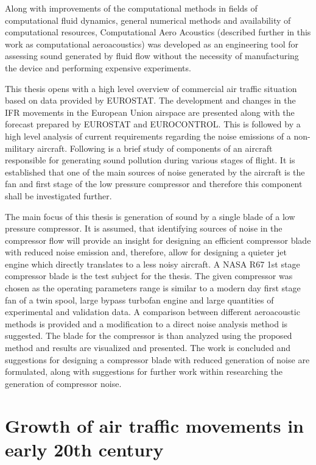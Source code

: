 Along with improvements of the computational methods in fields of computational fluid dynamics, general numerical methods and availability of computational resources, Computational Aero Acoustics (described further in this work as computational aeroacoustics) was developed as an engineering tool for assessing sound generated by fluid flow without the necessity of manufacturing the device and performing expensive experiments.

This thesis opens with a high level overview of commercial air traffic situation based on data provided by EUROSTAT. The development and changes in the IFR movements in the European Union airspace are presented along with the forecast prepared by EUROSTAT and EUROCONTROL. This is followed by a high level analysis of current requirements regarding the noise emissions of a non-military aircraft. Following is a brief study of components of an aircraft responsible for generating sound pollution during various stages of flight. It is established that one of the main sources of noise generated by the aircraft is the fan and first stage of the low pressure compressor and therefore this component shall be investigated further.

The main focus of this thesis is generation of sound by a single blade of a low pressure compressor. It is assumed, that identifying sources of noise in the compressor flow will provide an insight for designing an efficient compressor blade with reduced noise emission and, therefore, allow for designing a quieter jet engine which directly translates to a less noisy aircraft. A NASA R67 1st stage compressor blade is the test subject for the thesis. The given compressor was chosen as the operating parameters range is similar to a modern day first stage fan of a twin spool, large bypass turbofan engine and large quantities of experimental and validation data. A comparison between different aeroacoustic methods is provided and a modification to a direct noise analysis method is suggested. The blade for the compressor is than analyzed using the proposed method and results are visualized and presented. The work is concluded and suggestions for designing a compressor blade with reduced generation of noise are formulated, along with suggestions for further work within researching the generation of compressor noise. 

\section{Growth of air traffic movements in early 20th century}

